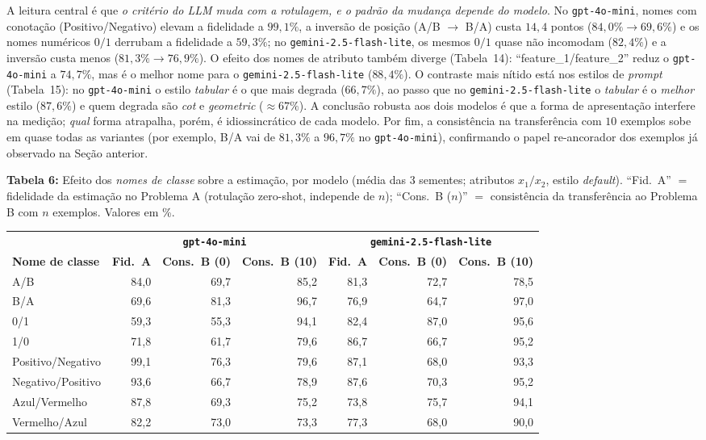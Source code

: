 \documentclass[12pt,a4paper]{article}
\begin{document}
A leitura central é que \emph{o critério do LLM muda com a rotulagem, e o padrão da
mudança depende do modelo}. No \texttt{gpt-4o-mini}, nomes com conotação
(Positivo/Negativo) elevam a fidelidade a $99{,}1\%$, a inversão de posição (A/B $\to$
B/A) custa $14{,}4$ pontos ($84{,}0\% \to 69{,}6\%$) e os nomes numéricos $0/1$ derrubam a
fidelidade a $59{,}3\%$; no \texttt{gemini-2.5-flash-lite}, os mesmos $0/1$ quase não
incomodam ($82{,}4\%$) e a inversão custa menos ($81{,}3\% \to 76{,}9\%$). O efeito dos
nomes de atributo também diverge (Tabela~14):
``feature\_1/feature\_2'' reduz o \texttt{gpt-4o-mini} a
$74{,}7\%$, mas é o melhor nome para o \texttt{gemini-2.5-flash-lite} ($88{,}4\%$). O
contraste mais nítido está nos estilos de \emph{prompt}
(Tabela~15): no \texttt{gpt-4o-mini} o estilo
\emph{tabular} é o que mais degrada ($66{,}7\%$), ao passo que no
\texttt{gemini-2.5-flash-lite} o \emph{tabular} é o \emph{melhor} estilo ($87{,}6\%$) e
quem degrada são \emph{cot} e \emph{geometric} ($\approx 67\%$). A conclusão robusta aos
dois modelos é que a forma de apresentação interfere na medição; \emph{qual} forma
atrapalha, porém, é idiossincrático de cada modelo. Por fim, a consistência na
transferência com $10$ exemplos sobe em quase todas as variantes (por exemplo, B/A vai de
$81{,}3\%$ a $96{,}7\%$ no \texttt{gpt-4o-mini}), confirmando o papel re-ancorador dos
exemplos já observado na Seção anterior.


\bigskip

\noindent \textbf{Tabela 6:} Efeito dos \emph{nomes de classe} sobre a estimação, por modelo (média das $3$
sementes; atributos $x_1/x_2$, estilo \emph{default}). ``Fid.\
A'' $=$ fidelidade da estimação no Problema A (rotulação zero-shot, independe de $n$);
``Cons.\ B ($n$)'' $=$ consistência da transferência ao Problema B com $n$ exemplos.
Valores em \%.

\begin{tabular}{lrrrrrr}
\toprule
& \multicolumn{3}{c}{\textbf{\texttt{gpt-4o-mini}}} &
\multicolumn{3}{c}{\textbf{\texttt{gemini-2.5-flash-lite}}} \\
\cmidrule(lr){2-4}\cmidrule(lr){5-7}
\textbf{Nome de classe} & \textbf{Fid.\ A} & \textbf{Cons.\ B (0)} & \textbf{Cons.\ B (10)} &
\textbf{Fid.\ A} & \textbf{Cons.\ B (0)} & \textbf{Cons.\ B (10)} \\
\midrule
A/B               & 84,0 & 69,7 & 85,2 & 81,3 & 72,7 & 78,5 \\
B/A               & 69,6 & 81,3 & 96,7 & 76,9 & 64,7 & 97,0 \\
0/1               & 59,3 & 55,3 & 94,1 & 82,4 & 87,0 & 95,6 \\
1/0               & 71,8 & 61,7 & 79,6 & 86,7 & 66,7 & 95,2 \\
Positivo/Negativo & 99,1 & 76,3 & 79,6 & 87,1 & 68,0 & 93,3 \\
Negativo/Positivo & 93,6 & 66,7 & 78,9 & 87,6 & 70,3 & 95,2 \\
Azul/Vermelho     & 87,8 & 69,3 & 75,2 & 73,8 & 75,7 & 94,1 \\
Vermelho/Azul     & 82,2 & 73,0 & 73,3 & 77,3 & 68,0 & 90,0 \\
\bottomrule
\end{tabular}
\end{document}
